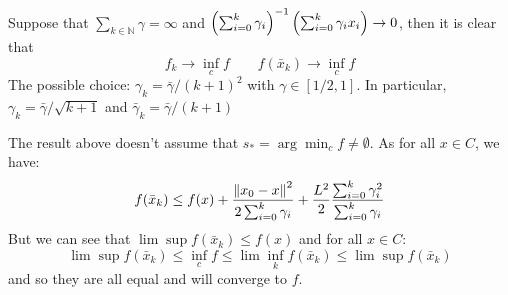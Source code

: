 \begin{corollary}
    Suppose that $\sum_{k\in\mathbb{N}}\gamma=\infty$ and $ \left( \sum^k_{i=0}\gamma_i \right)^{-1}\left( \sum^k_{i=0}\gamma_ix_i \right)\rightarrow0$, then it is clear that 
    \begin{equation*}
        f_k\rightarrow \inf_cf \qquad f(\bar{x}_k)\rightarrow \inf_cf
    \end{equation*}
    The possible choice: $\gamma_k = \bar{\gamma}/(k+1)^2$ with $\gamma\in[1/2, 1]$. In particular, $\gamma_k = \bar{\gamma}/\sqrt{k+1}$ and $\bar{\gamma}_k = \bar{\gamma}/(k+1)$
\end{corollary}

\begin{remark}
    The result above doesn't assume that $s_* = \arg\min_c f \ne \emptyset$. As for all $x\in C$, we have:
    \begin{equation*}
        f(\bar{x}_k) \le f(x) + \frac{\left\lVert x_0-x\right\rVert^2}{2\sum^k_{i=0}\gamma_i} + \frac{L^2}{2}\frac{\sum^k_{i=0}\gamma_i^2}{\sum^k_{i=0}\gamma_i}
    \end{equation*}
    But we can see that $\lim\sup f(\bar{x}_k) \le f(x)$ and for all $x\in C$:
    \begin{equation*}
        \lim\sup f(\bar{x}_k) \le \inf_c f \le \lim\inf_kf(\bar{x}_k)\le\lim\sup f(\bar{x}_k)
    \end{equation*}
    and so they are all equal and will converge to $f$.
\end{remark}


